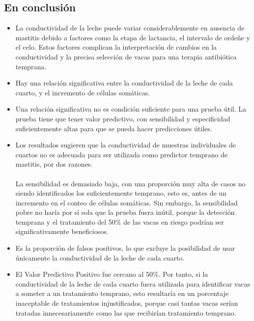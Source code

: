 \documentclass[a4paper, 11pt]{article}
\begin{document}
\subsection{En conclusión}
\begin{itemize}
	\item La conductividad de la leche puede variar considerablemente en ausencia de mastitis debido a factores como la etapa de lactancia, el intervalo de ordeñe y el celo. Estos factores complican la interpretación de cambios en la conductividad y la precisa selección de vacas para una terapia antibiótica temprana.
	\item Hay una relación significativa entre la conductividad de la leche de cada cuarto, y el incremento de células somáticas.
	\item Una relación significativa no es condición suficiente para una prueba útil. La prueba tiene que tener valor predictivo, con sensibilidad y especificidad suficientemente altas para que se pueda hacer predicciones útiles.
	\item Los resultados sugieren que la conductividad de muestras individuales de cuartos no es adecuada para ser utilizada como predictor temprano de mastitis, por dos razones. \\\\
	La sensibilidad es demasiado baja, con una proporción muy alta de casos no siendo identificados los suficientemente temprano, esto es, antes de un incremento en el conteo de células somáticas. Sin embargo, la sensibilidad pobre no haría por sí sola que la prueba fuera inútil, porque la detección temprana y el tratamiento del 50\% de las vacas en riesgo podrían ser significativamente beneficiosos. 
	\item Es la proporción de falsos positivos, lo que excluye la posibilidad de usar únicamente la conductividad de la leche de cada cuarto.
	\item El Valor Predictivo Positivo fue cercano al 50\%. Por tanto, si la conductividad de la leche de cada cuarto fuera utilizada para identificar vacas a someter a un tratamiento temprano, esto resultaría en un porcentaje inaceptable de tratamientos injustificados, porque casi tantas vacas serían tratadas innecesariamente como las que recibirían tratamiento temprano.
	\end{itemize}
\end{document}
